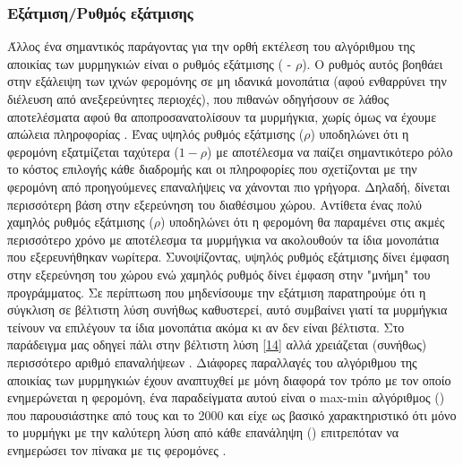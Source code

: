 \subsubsection{Εξάτμιση/Ρυθμός εξάτμισης}
Άλλος ένα σημαντικός παράγοντας για την ορθή εκτέλεση του αλγόριθμου της αποικίας των μυρμηγκιών είναι ο ρυθμός εξάτμισης ( - $ρ$). Ο ρυθμός αυτός βοηθάει στην εξάλειψη των ιχνών φερομόνης σε μη ιδανικά μονοπάτια (αφού ενθαρρύνει την διέλευση από ανεξερεύνητες περιοχές), που πιθανών οδηγήσουν σε λάθος αποτελέσματα αφού θα αποπροσανατολίσουν τα μυρμήγκια, χωρίς όμως να έχουμε απώλεια πληροφορίας \cite{mavrovouniotis2014ant, mpikou2013euretikoi}. Ένας υψηλός ρυθμός εξάτμισης ($ρ$) υποδηλώνει ότι η φερομόνη εξατμίζεται ταχύτερα ($1-ρ$) με αποτέλεσμα να παίζει σημαντικότερο ρόλο το κόστος επιλογής κάθε διαδρομής και οι πληροφορίες που σχετίζονται με την φερομόνη από προηγούμενες επαναλήψεις να χάνονται πιο γρήγορα. Δηλαδή, δίνεται περισσότερη βάση στην εξερεύνηση του διαθέσιμου χώρου. Αντίθετα ένας πολύ χαμηλός ρυθμός εξάτμισης ($ρ$) υποδηλώνει ότι η φερομόνη θα παραμένει στις ακμές περισσότερο χρόνο με αποτέλεσμα τα μυρμήγκια να ακολουθούν τα ίδια μονοπάτια που εξερευνήθηκαν νωρίτερα.
Συνοψίζοντας, υψηλός ρυθμός εξάτμισης δίνει έμφαση στην εξερεύνηση του χώρου ενώ χαμηλός ρυθμός δίνει έμφαση στην "μνήμη" του προγράμματος. Σε περίπτωση που μηδενίσουμε την εξάτμιση παρατηρούμε ότι η σύγκλιση σε βέλτιστη λύση συνήθως καθυστερεί, αυτό συμβαίνει γιατί τα μυρμήγκια τείνουν να επιλέγουν τα ίδια μονοπάτια ακόμα κι αν δεν είναι βέλτιστα. Στο παράδειγμα μας οδηγεί πάλι στην βέλτιστη λύση \ref{14} αλλά χρειάζεται (συνήθως) περισσότερο αριθμό επαναλήψεων \cite{mpikou2013euretikoi}. Διάφορες παραλλαγές του αλγόριθμου της αποικίας των μυρμηγκιών έχουν αναπτυχθεί με μόνη διαφορά τον τρόπο με τον οποίο ενημερώνεται η φερομόνη, ένα παραδείγματα αυτού είναι ο max-min αλγόριθμος () που παρουσιάστηκε από τους  και  το 2000 και είχε ως βασικό χαρακτηριστικό ότι μόνο το μυρμήγκι με την καλύτερη λύση από κάθε επανάληψη () επιτρεπόταν να ενημερώσει τον πίνακα με τις φερομόνες \cite{stutzle2000max}.


